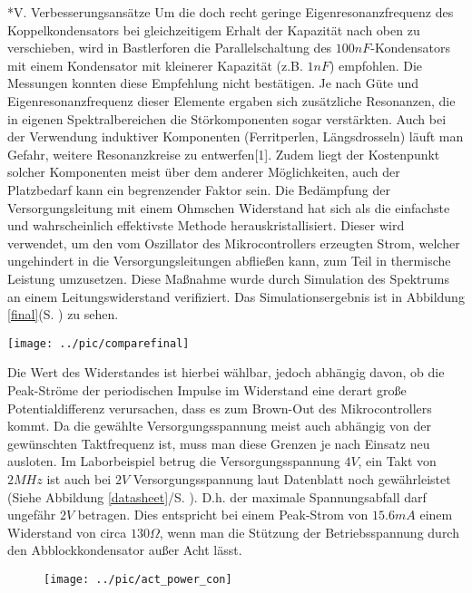 \documentclass[a4paper,10pt, twocolumn]{article}
\begin{document}
\begin{section}*{V. Verbesserungsansätze}
Um die doch recht geringe Eigenresonanzfrequenz des Koppelkondensators bei 
gleichzeitigem Erhalt der Kapazität nach oben zu verschieben, wird in  
Bastlerforen die 
Parallelschaltung des $100nF$-Kondensators mit einem 
Kondensator mit kleinerer Kapazität (z.B. $1nF$) empfohlen. Die Messungen 
konnten diese Empfehlung nicht bestätigen. Je nach Güte und 
Eigenresonanzfrequenz dieser Elemente ergaben sich zusätzliche Resonanzen, die 
in eigenen Spektralbereichen die Störkomponenten sogar verstärkten. Auch bei 
der Verwendung induktiver Komponenten (Ferritperlen, Längsdrosseln) läuft man 
Gefahr, weitere Resonanzkreise zu entwerfen[1]. Zudem liegt der Kostenpunkt 
solcher Komponenten meist über dem anderer Möglichkeiten, auch der Platzbedarf 
kann ein begrenzender Faktor sein. 
Die Bedämpfung der Versorgungsleitung mit einem Ohmschen Widerstand hat sich 
als die einfachste und wahrscheinlich effektivste Methode herauskristallisiert. 
Dieser wird verwendet, um den vom Oszillator des Mikrocontrollers erzeugten 
Strom, welcher ungehindert in die Versorgungsleitungen abfließen kann, zum Teil 
in thermische Leistung umzusetzen. 
Diese Maßnahme wurde durch Simulation des Spektrums an einem 
Leitungswiderstand verifiziert. Das Simulationsergebnis ist in Abbildung 
\ref{final}(S. \pageref{final}) zu sehen.
\begin{figure*}
  \centering
  \texttt{[image: ../pic/comparefinal]}
  \caption{Vergleich der verbesserten und der einfachen Entstörung}
  \label{final}
\end{figure*}
Die Wert des Widerstandes ist hierbei 
wählbar, jedoch abhängig davon, ob die Peak-Ströme der periodischen Impulse 
im Widerstand eine derart große Potentialdifferenz verursachen, dass es zum 
Brown-Out des Mikrocontrollers kommt. Da die gewählte Versorgungsspannung meist 
auch 
abhängig von der gewünschten Taktfrequenz ist, muss man diese Grenzen je nach 
Einsatz neu ausloten. Im Laborbeispiel betrug die Versorgungsspannung $4V$, ein 
Takt von $2MHz$ ist auch bei $2V$ Versorgungsspannung laut Datenblatt noch 
gewährleistet (Siehe Abbildung \ref{datasheet}/S. \pageref{datasheet} ). D.h. 
der maximale Spannungsabfall darf ungefähr $2V$ 
betragen. Dies entspricht bei einem Peak-Strom von $15.6mA$ einem 
Widerstand von circa $130\Omega$, wenn man die Stützung der Betriebsspannung 
durch den Abblockkondensator außer Acht lässt.
\begin{figure}[H]
  \texttt{[image: ../pic/act\_power\_con]}

\end{figure}
\end{section}
\end{document}
